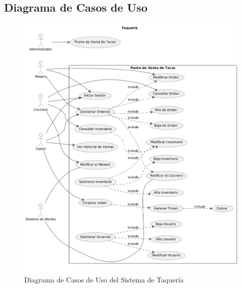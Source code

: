 \documentclass{article}
\begin{document}
\subsection{Diagrama de Casos de Uso}
\begin{figure}[H]
    \centering
    \includegraphics[width=1\textwidth]{casos/uml.png}
    \caption{Diagrama de Casos de Uso del Sistema de Taquería}
    \label{fig:diagrama_casos_uso}
\end{figure}
\end{document}
